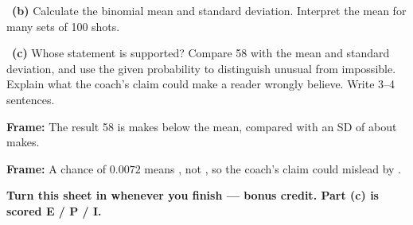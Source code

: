 \documentclass[11pt]{article}
\begin{document}
~\textbf{(b)} Calculate the binomial mean and standard deviation. Interpret the mean for many sets of 100 shots.\par
\workspace{1.3in}

~\textbf{(c)} Whose statement is supported? Compare 58 with the mean and standard deviation, and use the given probability to distinguish unusual from impossible. Explain what the coach's claim could make a reader wrongly believe. Write 3--4 sentences.\par
\workspace{2.0in}

\begin{sentenceframebox}\raggedright\textbf{Frame:} The result 58 is \blank[0.6in] makes below the mean, compared with an SD of about \blank[0.6in] makes.\end{sentenceframebox}

\begin{sentenceframebox}\raggedright\textbf{Frame:} A chance of $0.0072$ means \blank[1.5in], not \blank[1.0in], so the coach's claim could mislead by \blank[1.8in].\end{sentenceframebox}

\textbf{Turn this sheet in whenever you finish --- bonus credit. Part (c) is scored E / P / I.}\par
\end{document}
